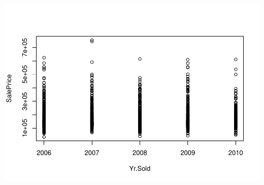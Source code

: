 \documentclass[
]{article}
\begin{document}
\includegraphics{Predicting-Housing-Price_files/figure-latex/unnamed-chunk-2-34.pdf}
\end{document}
